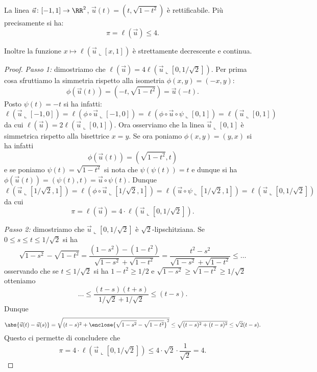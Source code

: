     \begin{theorem}
    \label{th:ell_u}%
    La linea $\vec u\colon [-1,1]\to \RR^2$, $\vec u(t) = (t,\sqrt{1-t^2})$
    è rettificabile. Più precisamente si ha:
    \[
      \pi  = \ell(\vec u) \le 4.  
    \]
    
    Inoltre la funzione $x\mapsto \ell(\vec u\llcorner [x,1])$ 
    è strettamente decrescente e continua.
    \end{theorem}
    \begin{proof}
    
    \emph{Passo 1:}
    dimostriamo che $\ell(\vec u ) = 4 \ell(\vec u\llcorner[0,1/\sqrt 2])$. 
    Per prima cosa sfruttiamo la simmetria rispetto alla isometria 
    $\phi(x,y) = (-x,y)$:
    \[
      \phi(\vec u(t)) = (-t,\sqrt{1-t^2})
      = \vec u(-t).
    \]
    Posto $\psi(t)=-t$ si ha infatti:
    \[
    \ell(\vec u \llcorner[-1,0]) 
    = \ell(\phi\circ \vec u \llcorner [-1,0])
    = \ell(\phi\circ \vec u \circ \psi \llcorner[0,1])
    = \ell(\vec u\llcorner[0,1])
    \]
    da cui $\ell(\vec u) = 2 \ell(\vec u \llcorner[0,1])$.
    Ora osserviamo che la linea $\vec u\llcorner[0,1]$ 
    è simmetrica rispetto alla bisettrice $x=y$.
    Se ora poniamo $\phi(x,y) = (y,x)$ si ha infatti 
    \[
    \phi(\vec u(t)) = (\sqrt{1-t^2},t)   
    \]
    e se poniamo $\psi(t) = \sqrt{1-t^2}$ si nota che 
    $\psi(\psi(t)) = t$ e dunque 
    si ha $\phi(\vec u(t)) = (\psi(t),t)
    =\vec u\circ \psi(t)$. 
    Dunque 
    \[
    \ell(\vec u\llcorner[1/\sqrt 2,1])
    = \ell(\phi\circ \vec u \llcorner[1/\sqrt 2, 1])
    = \ell(\vec u\circ \psi \llcorner[1/\sqrt 2, 1])  
    = \ell(\vec u\llcorner [0,1/\sqrt 2])
    \]
    da cui 
    \[
    \pi = \ell(\vec u) = 4 \cdot \ell(\vec u \llcorner[0,1/\sqrt 2]).  
    \]
    
    \emph{Passo 2:} 
    dimostriamo che $\vec u\llcorner[0,1/\sqrt 2]$ è $\sqrt 2$-lipschitziana.
    Se $0 \le s\le t\le 1/\sqrt 2$ si ha 
    \[
      \sqrt{1-s^2} - \sqrt{1-t^2}
      = \frac{(1-s^2) - (1-t^2)}{\sqrt{1-s^2} + \sqrt{1-t^2}}
      = \frac{t^2-s^2}{\sqrt{1-s^2} + \sqrt{1-t^2}}
      \le \dots 
    \]
    osservando che se $t\le 1/\sqrt 2$ si ha $1-t^2 \ge 1/2$
    e $\sqrt{1-s^2} \ge \sqrt{1-t^2} \ge 1/\sqrt 2$
    otteniamo 
    \[
      \dots 
      \le \frac{(t-s)(t+s)}{1/\sqrt 2 + 1/\sqrt 2}
      \le (t-s).
    \]
    Dunque 
    \[
      \abs{\vec u(t)-\vec u(s)}
      =\sqrt{(t-s)^2 + \enclose{\sqrt{1-s^2}-\sqrt{1-t^2}}^2}
      \le \sqrt{(t-s)^2 + (t-s)^2} \le \sqrt 2 (t-s).  
    \]
    Questo ci permette di concludere che 
    \[
    \pi = 4 \cdot \ell(\vec u\llcorner [0,1/\sqrt 2])
    \le 4 \cdot \sqrt 2 \cdot \frac{1}{\sqrt 2} = 4.  
    \]
    

\end{proof}

